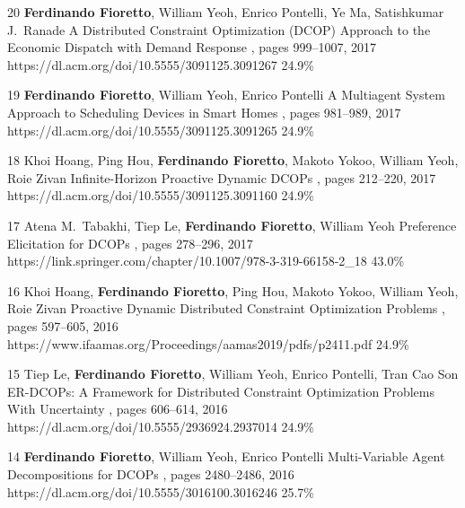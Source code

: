 \begin{pubs}
\confentry 
		{20} %
		{{\bf Ferdinando Fioretto}, William Yeoh, Enrico Pontelli, Ye Ma, Satishkumar J.~Ranade}
		{A Distributed Constraint Optimization (DCOP) Approach to the Economic Dispatch with Demand Response}
		{\procAAMAS, pages  999--1007, 2017}
		{https://dl.acm.org/doi/10.5555/3091125.3091267}
		{24.9\%}%

	\confentry 
		{19} %
		{{\bf Ferdinando Fioretto},  William Yeoh, Enrico Pontelli}
		{A Multiagent System Approach to Scheduling Devices in Smart Homes}
		{\procAAMAS, pages 981--989, 2017} 
		{https://dl.acm.org/doi/10.5555/3091125.3091265}
		{24.9\%}%

	\confentry
		{18} %
		{Khoi Hoang, Ping Hou, {\bf Ferdinando Fioretto}, Makoto Yokoo, William Yeoh, Roie Zivan}
		{Infinite-Horizon Proactive Dynamic DCOPs}
		{\procAAMAS, pages 212--220, 2017}
		{https://dl.acm.org/doi/10.5555/3091125.3091160}
		{24.9\%}%

	\confentry 
		{17} %
		{Atena M.~Tabakhi, Tiep Le, {\bf Ferdinando Fioretto}, William Yeoh}
		{Preference Elicitation for DCOPs}
		{\procCP, pages 278--296, 2017}
		{https://link.springer.com/chapter/10.1007/978-3-319-66158-2\_18}
		{43.0\%}%

\confentry 
		{16} %
		{Khoi Hoang, {\bf Ferdinando Fioretto}, Ping Hou, Makoto Yokoo, William Yeoh, Roie Zivan}
		{Proactive Dynamic Distributed Constraint Optimization Problems} 
		{\procAAMAS, pages 597--605, 2016}
		{https://www.ifaamas.org/Proceedings/aamas2019/pdfs/p2411.pdf}
		{24.9\%}%

\confentry 
		{15} %
		{Tiep Le, {\bf Ferdinando Fioretto}, William Yeoh, Enrico Pontelli, Tran Cao Son} 
		{ER-DCOPs: A Framework for Distributed Constraint Optimization Problems With Uncertainty} 
		{\procAAMAS,	pages 606--614, 2016}
		{https://dl.acm.org/doi/10.5555/2936924.2937014}
		{24.9\%}%

\confentry 
		{14} %
		{{\bf Ferdinando Fioretto}, William Yeoh, Enrico Pontelli}
		{Multi-Variable Agent Decompositions for DCOPs}
		{\procAAAI, pages 2480--2486, 2016}
		{https://dl.acm.org/doi/10.5555/3016100.3016246}
		{25.7\%}%


\end{pubs}
